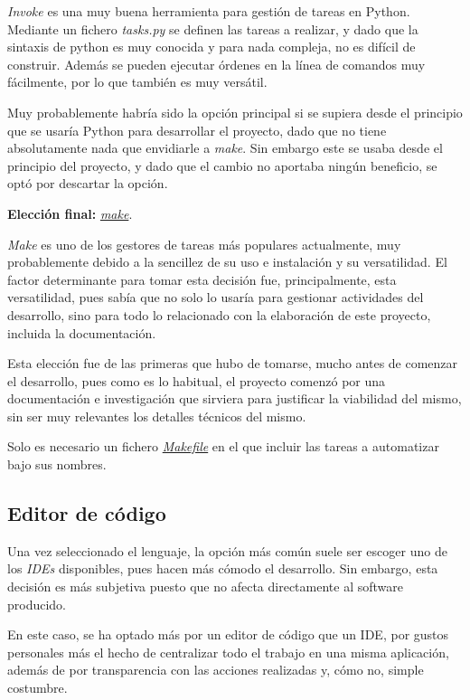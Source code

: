 \textit{Invoke} es una muy buena herramienta para gestión de tareas en Python. Mediante un fichero \textit{tasks.py} se definen las tareas a realizar, y dado que la sintaxis de python es muy conocida y para nada compleja, no es difícil de construir. Además se pueden ejecutar órdenes en la línea de comandos muy fácilmente, por lo que también es muy versátil.

Muy probablemente habría sido la opción principal si se supiera desde el principio que se usaría Python para desarrollar el proyecto, dado que no tiene absolutamente nada que envidiarle a \textit{make}. Sin embargo este se usaba desde el principio del proyecto, y dado que el cambio no aportaba ningún beneficio, se optó por descartar la opción.

\textbf{Elección final:} \href{https://www.gnu.org/software/make/}{\textit{make}}.

\textit{Make} es uno de los gestores de tareas más populares actualmente, muy probablemente debido a la sencillez de su uso e instalación y su versatilidad. El factor determinante para tomar esta decisión fue, principalmente, esta versatilidad, pues sabía que no solo lo usaría para gestionar actividades del desarrollo, sino para todo lo relacionado con la elaboración de este proyecto, incluida la documentación.

Esta elección fue de las primeras que hubo de tomarse, mucho antes de comenzar el desarrollo, pues como es lo habitual, el proyecto comenzó por una documentación e investigación que sirviera para justificar la viabilidad del mismo, sin ser muy relevantes los detalles técnicos del mismo.

Solo es necesario un fichero \href{https://github.com/Anglepi/My-Many-Reads/blob/main/Makefile}{\textit{Makefile}} en el que incluir las tareas a automatizar bajo sus nombres.

\subsection{Editor de código}
\label{Editor de código}

Una vez seleccionado el lenguaje, la opción más común suele ser escoger uno de los \textit{IDEs} disponibles, pues hacen más cómodo el desarrollo. Sin embargo, esta decisión es más subjetiva puesto que no afecta directamente al software producido.

En este caso, se ha optado más por un editor de código que un IDE, por gustos personales más el hecho de centralizar todo el trabajo en una misma aplicación, además de por transparencia con las acciones realizadas y, cómo no, simple costumbre.

